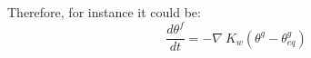 Therefore, for instance it could be:
\begin{equation}
\frac{d \theta^f}{dt} = - {\nabla}\ K_w ({\theta^g - \theta^g_{eq}})
\end{equation}